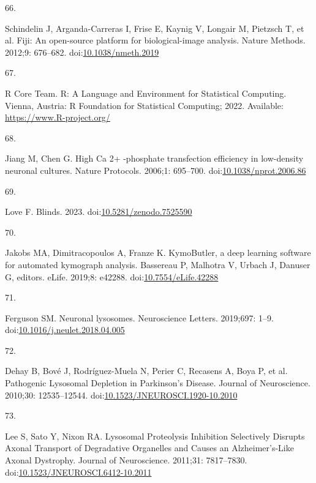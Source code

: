 \documentclass[
  12pt,
  a4paper,
]{book}
\newlength{\cslhangindent}
\newlength{\csllabelwidth}
\newlength{\cslentryspacingunit} %
\newenvironment{CSLReferences}[2] %
 {%
  \setlength{\parindent}{0pt}
  \ifodd #1
  \let\oldpar\par
  \def\par{\hangindent=\cslhangindent\oldpar}
  \fi
  \setlength{\parskip}{#2\cslentryspacingunit}
 }%
 {}
\newcommand{\CSLLeftMargin}[1]{\parbox[t]{\csllabelwidth}{#1}}
\newcommand{\CSLRightInline}[1]{\parbox[t]{\linewidth - \csllabelwidth}{#1}\break}
\begin{document}
\begin{CSLReferences}{0}{0}
\leavevmode{}%
\CSLLeftMargin{66. }%
\CSLRightInline{Schindelin J, Arganda-Carreras I, Frise E, Kaynig V, Longair M, Pietzsch T, et al. Fiji: An open-source platform for biological-image analysis. Nature Methods. 2012;9: 676--682. doi:\href{https://doi.org/10.1038/nmeth.2019}{10.1038/nmeth.2019}}

\leavevmode{}%
\CSLLeftMargin{67. }%
\CSLRightInline{R Core Team. R: {A Language} and {Environment} for {Statistical Computing}. {Vienna, Austria}: {R Foundation for Statistical Computing}; 2022. Available: \url{https://www.R-project.org/}}

\leavevmode{}%
\CSLLeftMargin{68. }%
\CSLRightInline{Jiang M, Chen G. High {Ca} 2+ -phosphate transfection efficiency in low-density neuronal cultures. Nature Protocols. 2006;1: 695--700. doi:\href{https://doi.org/10.1038/nprot.2006.86}{10.1038/nprot.2006.86}}

\leavevmode{}%
\CSLLeftMargin{69. }%
\CSLRightInline{Love F. Blinds. 2023. doi:\href{https://doi.org/10.5281/zenodo.7525590}{10.5281/zenodo.7525590}}

\leavevmode{}%
\CSLLeftMargin{70. }%
\CSLRightInline{Jakobs MA, Dimitracopoulos A, Franze K. {KymoButler}, a deep learning software for automated kymograph analysis. Bassereau P, Malhotra V, Urbach J, Danuser G, editors. eLife. 2019;8: e42288. doi:\href{https://doi.org/10.7554/eLife.42288}{10.7554/eLife.42288}}

\leavevmode{}%
\CSLLeftMargin{71. }%
\CSLRightInline{Ferguson SM. Neuronal lysosomes. Neuroscience Letters. 2019;697: 1--9. doi:\href{https://doi.org/10.1016/j.neulet.2018.04.005}{10.1016/j.neulet.2018.04.005}}

\leavevmode{}%
\CSLLeftMargin{72. }%
\CSLRightInline{Dehay B, Bové J, Rodríguez-Muela N, Perier C, Recasens A, Boya P, et al. Pathogenic {Lysosomal Depletion} in {Parkinson}'s {Disease}. Journal of Neuroscience. 2010;30: 12535--12544. doi:\href{https://doi.org/10.1523/JNEUROSCI.1920-10.2010}{10.1523/JNEUROSCI.1920-10.2010}}

\leavevmode{}%
\CSLLeftMargin{73. }%
\CSLRightInline{Lee S, Sato Y, Nixon RA. Lysosomal {Proteolysis Inhibition Selectively Disrupts Axonal Transport} of {Degradative Organelles} and {Causes} an {Alzheimer}'s-{Like Axonal Dystrophy}. Journal of Neuroscience. 2011;31: 7817--7830. doi:\href{https://doi.org/10.1523/JNEUROSCI.6412-10.2011}{10.1523/JNEUROSCI.6412-10.2011}}


\end{CSLReferences}
\end{document}
